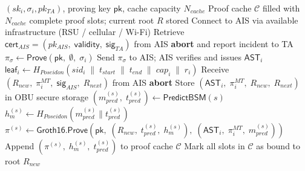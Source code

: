 \begin{algorithm}[t]
\caption{AST Acquisition and Offline Precomputation --- Phase 2 (Periodic)}
\label{alg:ast_acquisition}
\begin{algorithmic}[1]
\REQUIRE $(sk_i, \sigma_i, pk_{TA})$, proving key $\mathsf{pk}$, cache capacity $N_{\mathit{cache}}$
\ENSURE Proof cache $\mathcal{C}$ filled with $N_{\mathit{cache}}$ complete proof slots; current root $R$ stored
\STATE Connect to AIS via available infrastructure (RSU / cellular / Wi-Fi)
\STATE Retrieve $\mathsf{cert}_{AIS} = (pk_{AIS},\; \mathsf{validity},\; \mathsf{sig}_{TA})$ from AIS
    \STATE \textbf{abort} and report incident to TA
\ENDIF
\STATE $\pi_{\sigma} \leftarrow \mathsf{Prove}(\mathsf{pk},\; \emptyset,\; \sigma_i)$
    \hfill {}
\STATE Send $\pi_{\sigma}$ to AIS; AIS verifies and issues $\mathsf{AST}_i$
\STATE \quad $\mathsf{leaf}_i \leftarrow H_{\mathit{Poseidon}}(sid_i \;\|\; t_{\mathit{start}} \;\|\; t_{\mathit{end}} \;\|\; \mathit{cap}_i \;\|\; r_i)$
\STATE Receive $(R_{\mathit{new}},\; \pi^{MT}_i,\; \mathsf{sig}_{AIS},\; R_{\mathit{next}})$ from AIS
    \STATE \textbf{abort}
\ENDIF
\STATE Store $(\mathsf{AST}_i,\; \pi^{MT}_i,\; R_{\mathit{new}},\; R_{\mathit{next}})$ in OBU secure storage
    \STATE $(m^{(s)}_{\mathit{pred}},\; t^{(s)}_{\mathit{pred}}) \leftarrow \mathsf{PredictBSM}(s)$
        \hfill {}
    \STATE $h^{(s)}_m \leftarrow H_{\mathit{Poseidon}}(m^{(s)}_{\mathit{pred}} \| t^{(s)}_{\mathit{pred}})$
    \STATE $\pi^{(s)} \leftarrow \mathsf{Groth16.Prove}(\mathsf{pk},\; (R_{\mathit{new}},\; t^{(s)}_{\mathit{pred}},\; h^{(s)}_m),\; (\mathsf{AST}_i,\; \pi^{MT}_i,\; m^{(s)}_{\mathit{pred}}))$
    \STATE Append $(\pi^{(s)},\; h^{(s)}_m,\; t^{(s)}_{\mathit{pred}})$ to proof cache $\mathcal{C}$
\ENDFOR
\STATE Mark all slots in $\mathcal{C}$ as bound to root $R_{\mathit{new}}$
\end{algorithmic}
\end{algorithm}

